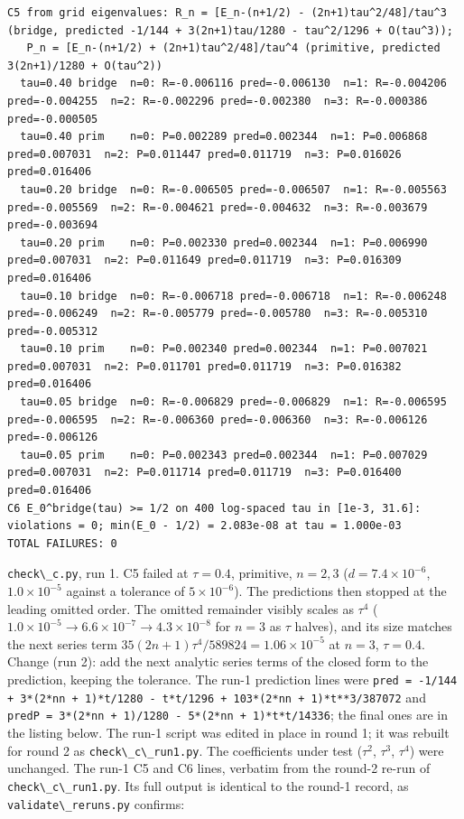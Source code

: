 \documentclass[11pt,a4paper]{article}
\newcommand{\passthrough}[1]{#1}
\begin{document}
\begin{lstlisting}
C5 from grid eigenvalues: R_n = [E_n-(n+1/2) - (2n+1)tau^2/48]/tau^3 (bridge, predicted -1/144 + 3(2n+1)tau/1280 - tau^2/1296 + O(tau^3));
   P_n = [E_n-(n+1/2) + (2n+1)tau^2/48]/tau^4 (primitive, predicted 3(2n+1)/1280 + O(tau^2))
  tau=0.40 bridge  n=0: R=-0.006116 pred=-0.006130  n=1: R=-0.004206 pred=-0.004255  n=2: R=-0.002296 pred=-0.002380  n=3: R=-0.000386 pred=-0.000505
  tau=0.40 prim    n=0: P=0.002289 pred=0.002344  n=1: P=0.006868 pred=0.007031  n=2: P=0.011447 pred=0.011719  n=3: P=0.016026 pred=0.016406
  tau=0.20 bridge  n=0: R=-0.006505 pred=-0.006507  n=1: R=-0.005563 pred=-0.005569  n=2: R=-0.004621 pred=-0.004632  n=3: R=-0.003679 pred=-0.003694
  tau=0.20 prim    n=0: P=0.002330 pred=0.002344  n=1: P=0.006990 pred=0.007031  n=2: P=0.011649 pred=0.011719  n=3: P=0.016309 pred=0.016406
  tau=0.10 bridge  n=0: R=-0.006718 pred=-0.006718  n=1: R=-0.006248 pred=-0.006249  n=2: R=-0.005779 pred=-0.005780  n=3: R=-0.005310 pred=-0.005312
  tau=0.10 prim    n=0: P=0.002340 pred=0.002344  n=1: P=0.007021 pred=0.007031  n=2: P=0.011701 pred=0.011719  n=3: P=0.016382 pred=0.016406
  tau=0.05 bridge  n=0: R=-0.006829 pred=-0.006829  n=1: R=-0.006595 pred=-0.006595  n=2: R=-0.006360 pred=-0.006360  n=3: R=-0.006126 pred=-0.006126
  tau=0.05 prim    n=0: P=0.002343 pred=0.002344  n=1: P=0.007029 pred=0.007031  n=2: P=0.011714 pred=0.011719  n=3: P=0.016400 pred=0.016406
C6 E_0^bridge(tau) >= 1/2 on 400 log-spaced tau in [1e-3, 31.6]: violations = 0; min(E_0 - 1/2) = 2.083e-08 at tau = 1.000e-03
TOTAL FAILURES: 0
\end{lstlisting}

\passthrough{\lstinline!check\_c.py!}, run 1. C5 failed at \(\tau=0.4\),
primitive, \(n=2,3\) (\(d = 7.4\times10^{-6}\), \(1.0\times10^{-5}\)
against a tolerance of \(5\times10^{-6}\)). The predictions then stopped
at the leading omitted order. The omitted remainder visibly scales as
\(\tau^4\) (\(1.0\times10^{-5}\to6.6\times10^{-7}\to4.3\times10^{-8}\)
for \(n=3\) as \(\tau\) halves), and its size matches the next series
term \(35(2n+1)\tau^4/589824 = 1.06\times10^{-5}\) at \(n=3\),
\(\tau=0.4\). Change (run 2): add the next analytic series terms of the
closed form to the prediction, keeping the tolerance. The run-1
prediction lines were
\passthrough{\lstinline!pred = -1/144 + 3*(2*nn + 1)*t/1280 - t*t/1296 + 103*(2*nn + 1)*t**3/387072!}
and
\passthrough{\lstinline!predP = 3*(2*nn + 1)/1280 - 5*(2*nn + 1)*t*t/14336!};
the final ones are in the listing below. The run-1 script was edited in
place in round 1; it was rebuilt for round 2 as
\passthrough{\lstinline!check\_c\_run1.py!}. The coefficients under test
(\(\tau^2\), \(\tau^3\), \(\tau^4\)) were unchanged. The run-1 C5 and C6
lines, verbatim from the round-2 re-run of
\passthrough{\lstinline!check\_c\_run1.py!}. Its full output is
identical to the round-1 record, as
\passthrough{\lstinline!validate\_reruns.py!} confirms:
\end{document}
